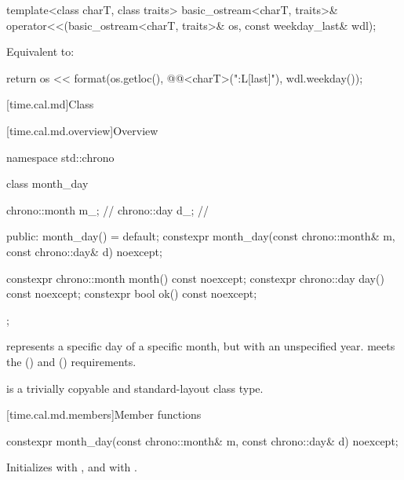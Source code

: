 %
\begin{itemdecl}
template<class charT, class traits>
  basic_ostream<charT, traits>&
    operator<<(basic_ostream<charT, traits>& os, const weekday_last& wdl);
\end{itemdecl}

\begin{itemdescr}
\pnum
\effects
Equivalent to:
\begin{codeblock}
return os << format(os.getloc(), @@<charT>("{:L}[last]"), wdl.weekday());
\end{codeblock}
\end{itemdescr}

[time.cal.md]{Class }

[time.cal.md.overview]{Overview}

\begin{codeblock}
namespace std::chrono {
  class month_day {
    chrono::month m_;           // \expos
    chrono::day   d_;           // \expos

  public:
    month_day() = default;
    constexpr month_day(const chrono::month& m, const chrono::day& d) noexcept;

    constexpr chrono::month month() const noexcept;
    constexpr chrono::day   day()   const noexcept;
    constexpr bool ok() const noexcept;
  };
}
\end{codeblock}

\pnum
{} represents a specific day of a specific month,
but with an unspecified year.
 meets the  ()
and  () requirements.

\pnum
{} is a trivially copyable and standard-layout class type.

[time.cal.md.members]{Member functions}

%
\begin{itemdecl}
constexpr month_day(const chrono::month& m, const chrono::day& d) noexcept;
\end{itemdecl}

\begin{itemdescr}
\pnum
\effects
Initializes  with , and  with .
\end{itemdescr}

